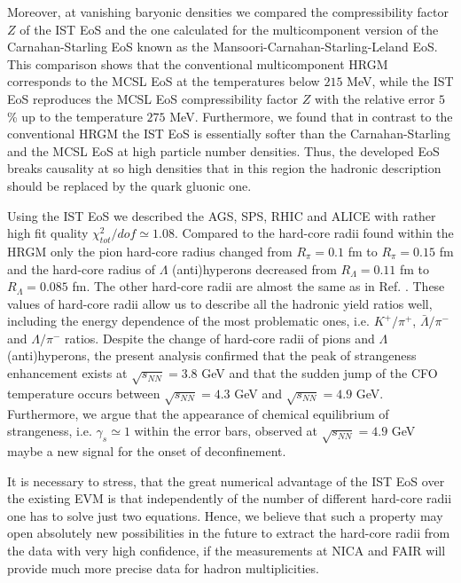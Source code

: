 \documentclass[12pt]{article}
\begin{document}
Moreover, at vanishing
baryonic densities we compared
the compressibility factor $Z$   of the IST EoS and the one calculated for the multicomponent version of the Carnahan-Starling EoS \cite{CSmultic} known as the Mansoori-Carnahan-Starling-Leland EoS. This comparison shows that the conventional  multicomponent HRGM corresponds to the MCSL EoS at  the temperatures below $215$ MeV, while the IST EoS reproduces 
 the MCSL EoS  compressibility factor $Z$ with the relative error $5$\% up to the  temperature   $275$ MeV. 
 Furthermore, we found that in contrast to the conventional  HRGM   the IST EoS  is essentially softer than the Carnahan-Starling  and the MCSL EoS at high particle number densities. Thus,   the developed EoS breaks causality at 
 so high   densities that  in this region   the hadronic
 description should be replaced by the quark gluonic one. 



Using the IST EoS we described the AGS, SPS, RHIC  and ALICE with rather high fit  quality $\chi^2_{tot}/dof  \simeq 1.08$.
Compared to the hard-core radii found within the HRGM \cite{Veta14} only the pion hard-core radius changed from $R_\pi = 0.1$ fm to $R_\pi = 0.15$ fm and the hard-core radius of $\Lambda$ (anti)hyperons decreased from $R_\Lambda = 0.11$ fm to $R_\Lambda= 0.085$ fm.  The other hard-core radii are almost the same as in   Ref. \cite{Veta14}. These values of hard-core radii allow us to describe all the hadronic yield ratios well, including the energy dependence of the  most problematic ones, i.e.  $K^+/\pi^+$,  $\bar{\Lambda}/\pi^{-}$ and  $\Lambda/\pi^{-}$ ratios. Despite the change of hard-core radii of pions and $\Lambda$ (anti)hyperons,
the present analysis confirmed that  the peak of  strangeness enhancement exists at $\sqrt{s_{NN}} = 3.8$ GeV and that  
the sudden jump of   the CFO temperature occurs  between $\sqrt{s_{NN}} = 4.3$ GeV and  $\sqrt{s_{NN}} = 4.9$ GeV.
 Furthermore, we argue that the appearance of chemical equilibrium of strangeness, i.e.  $\gamma_s \simeq 1$ within the error bars,  observed  at 
$\sqrt{s_{NN}} = 4.9$ GeV maybe a new signal  for  the onset of deconfinement.

It is necessary  to stress, that the great numerical  advantage of the IST EoS over the existing EVM is that  independently of the number of  different hard-core radii one has to solve just two equations.  Hence, we believe that such a property may open absolutely new possibilities in the future to extract the hard-core radii from the data with very high confidence, if the measurements at NICA and FAIR  will provide  much more precise  data for hadron multiplicities. 
\end{document}
